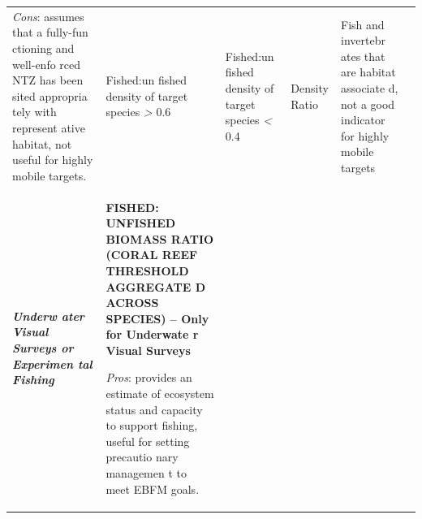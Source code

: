 \documentclass[]{book}
\begin{document}
\begin{longtable}[]{@{}llllll@{}}
\begin{minipage}[t]{0.16\columnwidth}
\emph{Cons}: assumes that a fully-fun ctioning and well-enfo rced NTZ
has been sited appropria tely with represent ative habitat, not useful
for highly mobile targets.\strut
\end{minipage} & \begin{minipage}[t]{0.16\columnwidth}\raggedright\strut
Fished:un fished density of target species \emph{\textgreater{}}
0.6\strut
\end{minipage} & \begin{minipage}[t]{0.16\columnwidth}\raggedright\strut
Fished:un fished density of target species \emph{\textless{}} 0.4\strut
\end{minipage} & \begin{minipage}[t]{0.16\columnwidth}\raggedright\strut
Density Ratio\strut
\end{minipage} & \begin{minipage}[t]{0.16\columnwidth}\raggedright\strut
Fish and invertebr ates that are habitat associate d, not a good
indicator for highly mobile targets\strut
\end{minipage}\tabularnewline
\begin{minipage}[t]{0.16\columnwidth}\raggedright\strut
\emph{\textbf{Underw ater Visual Surveys or Experimen tal Fishing}
}\strut
\end{minipage} & \begin{minipage}[t]{0.16\columnwidth}\raggedright\strut
\textbf{FISHED: UNFISHED BIOMASS RATIO (CORAL REEF THRESHOLD AGGREGATE D
ACROSS SPECIES) -- Only for Underwate r Visual Surveys}

\emph{Pros}: provides an estimate of ecosystem status and capacity to
support fishing, useful for setting precautio nary managemen t to meet
EBFM goals.


\end{minipage}
\end{longtable}
\end{document}
